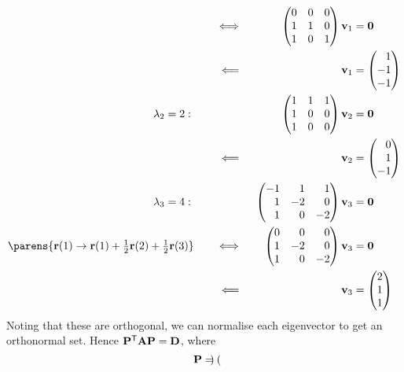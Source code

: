 \documentclass[fleqn,a4paper,11pt]{article}
\begin{document}
\begin{enumerate}[label=\textbf{\arabic*.}]
\begin{alignat*}
{    }\quad
    &&\iff{}&&
    \begin{pmatrix}
     0 & 0 & 0 \\
     1 & 1 & 0 \\
     1 & 0 & 1
    \end{pmatrix}
    \vec v_1 &= \vec 0 \\
    &&\impliedby{}&&
    \vec v_1 &= \begin{pmatrix*}[r] 1 \\ -1 \\ -1 \end{pmatrix*} \\
    \lambda_2 = 2:\quad{}&& &&
    \begin{pmatrix}
     1 & 1 & 1 \\
     1 & 0 & 0 \\
     1 & 0 & 0
    \end{pmatrix}
    \vec v_2 &= \vec 0 \\
    &&\impliedby{}&&
    \vec v_2 &= \begin{pmatrix*}[r] 0 \\ 1 \\ -1 \end{pmatrix*} \\
    \lambda_3 = 4:\quad{}&& &&
    \begin{pmatrix*}[r]
     -1 & 1 & 1 \\
     1 & -2 & 0 \\
     1 & 0 & -2
    \end{pmatrix*}
    \vec v_3 &= \vec 0 \\
    \parens{
     \vec r(1) \to \vec r(1) + \tfrac 12\vec r(2) + \tfrac 12\vec r(3)
    }\quad
    &&\iff{}&&
    \begin{pmatrix*}[r]
     0 & 0 & 0 \\
     1 & -2 & 0 \\
     1 & 0 & -2
    \end{pmatrix*}
    \vec v_3 &= \vec 0 \\
    &&\impliedby{}&&
    \vec v_3 &= \begin{pmatrix} 2 \\ 1 \\ 1 \end{pmatrix}
   \end{alignat*}
   Noting that these are orthogonal, we can normalise each eigenvector to get an
   orthonormal set. Hence \(\mathbf{P}^{\mathsf T} \mathbf{A} \mathbf{P} = \mathbf{D}\), where
   \begin{equation*}
    \mat P =
    \begin{pmatrix*}[r]

\end{pmatrix*}
\end{equation*}
\end{enumerate}
\end{document}
